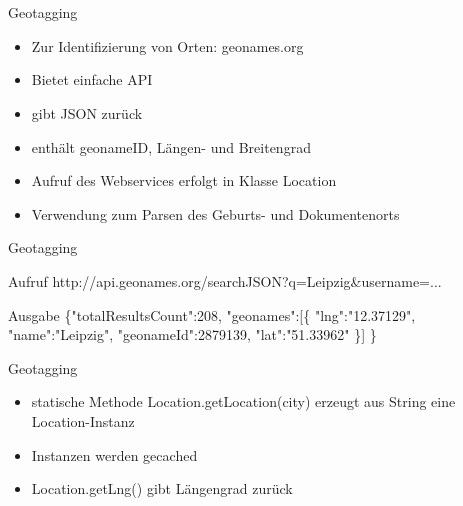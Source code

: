\documentclass[12pt]{beamer}
\begin{document}
\begin{large}
 \subsection*{~}

\begin{frame}{Geotagging}
\begin{itemize}
  \item Zur Identifizierung von Orten: geonames.org
  \item Bietet einfache API
  \item gibt JSON zurück
  \item enthält geonameID, Längen- und Breitengrad
  \item Aufruf des Webservices erfolgt in Klasse Location
  \item Verwendung zum Parsen des Geburts- und Dokumentenorts
 \end{itemize}
\end{frame}
 
\begin{frame}{Geotagging}
 \vspace*{\fill}
 \begin{block}{Aufruf}
 \normalsize http://api.geonames.org/searchJSON?q=Leipzig\&username=...
 \end{block}
 
 \begin{block}{Ausgabe}
 \normalsize \{"{}totalResultsCount"{}:208,
  \newline
  \hspace*{0.5cm}"{}geonames"{}:[\{
  \newline
  \hspace*{1cm}"{}lng"{}:"{}12.37129"{},
  \newline
  \hspace*{1cm}"{}name"{}:"{}Leipzig"{},
  \newline  
  \hspace*{1cm}"{}geonameId"{}:2879139,
  \newline
  \hspace*{1cm}"{}lat"{}:"{}51.33962"{}
  \newline
  \hspace*{0.5cm}\}]
  \newline
  \}
 \end{block}
\end{frame} 
 
\begin{frame}{Geotagging}
 \begin{itemize}
  \item statische Methode Location.getLocation(city) erzeugt aus String eine Location-Instanz
  \item Instanzen werden gecached
  \item Location.getLng() gibt Längengrad zurück
 \end{itemize}
 

\end{frame}
\end{large}
\end{document}
